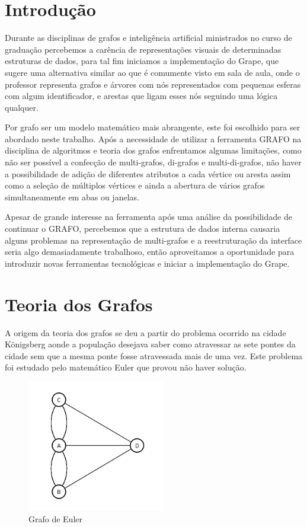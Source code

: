 \documentclass[a4paper]{abnt}
\begin{document}
\chapter{Introdução}
\setcounter{page}{10}
Durante as disciplinas de grafos e inteligência artificial ministrados no curso de graduação percebemos a carência de representações visuais de determinadas estruturas de dados, para tal fim iniciamos a implementação do Grape, que sugere uma alternativa similar ao que é comumente visto em sala de aula, onde o professor representa grafos e árvores com nós representados com pequenas esferas com algum identificador, e arestas que ligam esses nós seguindo uma lógica qualquer. 

Por grafo ser um modelo matemático mais abrangente, este foi escolhido para ser abordado neste trabalho. Após a necessidade de utilizar a ferramenta GRAFO \cite{grafo} na disciplina de algoritmos e teoria dos grafos enfrentamos algumas limitações, como não ser possível a confecção de multi-grafos, di-grafos e multi-di-grafos, não haver a possibilidade de adição de diferentes atributos a cada vértice ou aresta assim como a seleção de múltiplos vértices e ainda a abertura de vários grafos simultaneamente em abas ou janelas. 

Apesar de grande interesse na ferramenta após uma análise da possibilidade de continuar o GRAFO,  percebemos que a estrutura de dados interna causaria alguns problemas na representação de multi-grafos e a reestruturação da interface seria algo demasiadamente trabalhoso, então aproveitamos a oportunidade para introduzir novas ferramentas tecnológicas e iniciar a implementação do Grape.
\chapter{Teoria dos Grafos}
\label{sec:revisao_bibliografica}
A origem da teoria dos grafos se deu a partir do problema ocorrido na cidade Königsberg aonde a população desejava saber como atravessar as sete pontes da cidade sem que a mesma ponte fosse atravessada mais de uma vez. Este problema foi estudado pelo matemático Euler que provou não haver solução.

\begin{figure}[htb]
    \centering
	\includegraphics[width=6cm]{euler_graph.png}
	\caption{Grafo de Euler}
	\label{img_graph_euler}
\end{figure}
\end{document}
